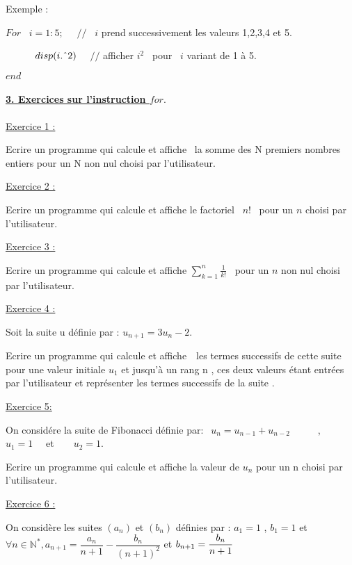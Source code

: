 \documentclass{article}
\begin{document}
\bigskip

Exemple :

$For$ \ $i=1:5;$ \ \ $//$ \ $i$ prend successivement les valeurs 1,2,3,4 et
5.

\ \ \ \ \ \ $disp(i.\symbol{94}2)$ \ \ $//$ afficher $i^{2}$ \ pour \ $i$
variant de 1 \`{a} 5.

$end$

\bigskip

\paragraph{\protect\underline{3. Exercices sur l'instruction $for.$}}

\underline{Exercice 1 :}

Ecrire un programme qui calcule et affiche \ la somme des N premiers nombres
entiers pour un N non nul choisi par l'utilisateur.

\underline{Exercice 2 :}

Ecrire un programme qui calcule et affiche le factoriel \ $n!$ \ pour un $n$
choisi par l'utilisateur.

\underline{Exercice 3 :}

Ecrire un programme qui calcule et affiche $\sum_{k=1}^{n}\frac{1}{k!}$ \
pour un $n$ non nul choisi par l'utilisateur.

\underline{Exercice 4 :}

Soit la suite u d\'{e}finie par : $u_{n+1}=3u_{n}-2.$

Ecrire un programme qui calcule et affiche\ \ les termes successifs de cette
suite pour une valeur initiale $u_{1}$ et jusqu'\`{a} un rang n , ces deux
valeurs \'{e}tant entr\'{e}es par l'utilisateur et repr\'{e}senter les
termes successifs de la suite .

\underline{Exercice 5:}

On consid\'{e}re la suite de Fibonacci d\'{e}finie par: $\ \
u_{n}=u_{n-1}+u_{n-2}$ \ \ \ \ \ ,\ \ $u_{1}=1$ \ \ et\ \ \ \ $u_{2}=1.$

Ecrire un programme qui calcule et affiche la valeur de $u_{n}$ pour un n
choisi par l'utilisateur.

\underline{Exercice 6 :}

On consid\`{e}re les suites $\left( a_{n}\right) $ et $\left( b_{n}\right) $
d\'{e}finies par : $a_{1}=1$ , $b_{1}=1$ et $\forall n\in \mathbb{N}^{\ast
},a_{n+1}=\dfrac{a_{n}}{n+1}-\dfrac{b_{n}}{\left( n+1\right) ^{2}}$ et $%
b_{n+1}=\dfrac{b_{n}}{n+1}\smallskip $
\end{document}
